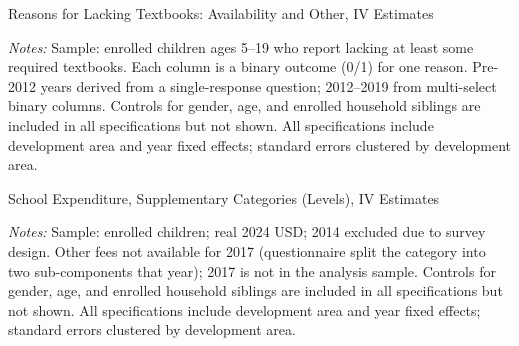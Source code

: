 \documentclass[12pt]{article}
\newcommand*{\TableLagOnePath}{../Paper_3_Tables/Lagged_1Year_Tables}
\begin{document}
	\begin{table}[H]
	\centering
	\begin{adjustbox}{max width=\linewidth, center}
	\begin{threeparttable}
		\caption{Reasons for Lacking Textbooks: Availability and Other, IV Estimates}
		\label{tab:nobooksrsn_availability}
		{\small}
		\begin{tablenotes}
			\small
			\item \textit{Notes:} Sample: enrolled children ages 5--19 who report lacking at least some required textbooks. Each column is a binary outcome (0/1) for one reason. Pre-2012 years derived from a single-response question; 2012--2019 from multi-select binary columns. Controls for gender, age, and enrolled household siblings are included in all specifications but not shown. All specifications include development area and year fixed effects; standard errors clustered by development area.
		\end{tablenotes}
	\end{threeparttable}
	\end{adjustbox}
	\end{table}

	\begin{table}[H]
	\centering
	\begin{adjustbox}{max width=\linewidth, center}
	\begin{threeparttable}
		\caption{School Expenditure, Supplementary Categories (Levels), IV Estimates}
		\label{tab:expenditures_supp_level}
		{\small}
		\begin{tablenotes}
			\small
			\item \textit{Notes:} Sample: enrolled children; real 2024 USD; 2014 excluded due to survey design. Other fees not available for 2017 (questionnaire split the category into two sub-components that year); 2017 is not in the analysis sample. Controls for gender, age, and enrolled household siblings are included in all specifications but not shown. All specifications include development area and year fixed effects; standard errors clustered by development area.
		\end{tablenotes}
	\end{threeparttable}
	\end{adjustbox}
	\end{table}
\end{document}
